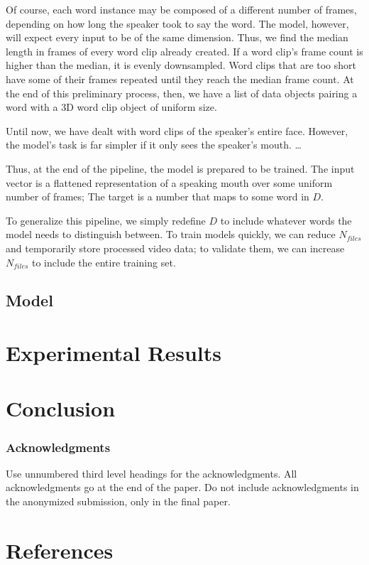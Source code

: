\documentclass{article}
\begin{document}
Of course, each word instance may be composed of a different number of frames, depending on how long the speaker took to say the word. The model, however, will expect every input to be of the same dimension. Thus, we find the median length in frames of every word clip already created. If a word clip's frame count is higher than the median, it is evenly downsampled. Word clips that are too short have some of their frames repeated until they reach the median frame count. At the end of this preliminary process, then, we have a list of data objects pairing a word with a 3D word clip object of uniform size.

Until now, we have dealt with word clips of the speaker's entire face. However, the model's task is far simpler if it only sees the speaker's mouth. \dots

Thus, at the end of the pipeline, the model is prepared to be trained. The input vector is a flattened representation of a speaking mouth over some uniform number of frames; The target is a number that maps to some word in $D$.

To generalize this pipeline, we simply redefine $D$ to include whatever words the model needs to distinguish between. To train models quickly, we can reduce $N_{files}$ and temporarily store processed video data; to validate them, we can increase $N_{files}$ to include the entire training set.

\subsection{Model}

\section{Experimental Results}

\section{Conclusion}

\subsubsection*{Acknowledgments}

Use unnumbered third level headings for the acknowledgments. All acknowledgments
go at the end of the paper. Do not include acknowledgments in the anonymized
submission, only in the final paper.

\section*{References}
\small
\end{document}
